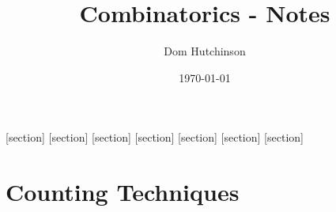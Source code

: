 \documentclass[11pt,a4paper]{article}
\begin{document}
\pagestyle{fancy}
\setlength\parindent{0pt}
\allowdisplaybreaks

\renewcommand{\headrulewidth}{0pt}

\title{Combinatorics - Notes}
\author{Dom Hutchinson}
\date{\today}
\maketitle

\fancyhead[R]{\today}

[section]
[section]
[section]
[section]
[section]
[section]
[section]

\newcommand{\dotprod}[0]{\boldsymbol{\cdot}}
\newcommand{\cosech}[0]{\mathrm{cosech}\ }
\newcommand{\cosec}[0]{\mathrm{cosec}\ }
\newcommand{\sech}[0]{\mathrm{sech}\ }
\newcommand{\blocks}[0]{\mathbb{B}}
\newcommand{\nats}[0]{\mathbb{N}}
\newcommand{\real}[0]{\mathbb{R}}
\newcommand{\integers}[0]{\mathbb{Z}}
\newcommand{\nb}[0]{\textit{N.B.} }

\newcommand{\definition}[1]{\stepcounter{definition} \textbf{Definition \arabic{section}.\arabic{definition}\ - }\textit{#1}\\}
\newcommand{\example}[1]{\stepcounter{example} \textbf{Example \arabic{section}.\arabic{example}\ - }\textit{#1}\\}
\newcommand{\notation}[1]{\stepcounter{notation} \textbf{Notation \arabic{section}.\arabic{notation}\ - }\textit{#1}\\}
\newcommand{\proof}[1]{\stepcounter{proof} \textbf{Proof \arabic{section}.\arabic{proof}\ - }\textit{#1}\\}
\newcommand{\proposition}[1]{\stepcounter{proposition} \textbf{Proposition \arabic{section}.\arabic{proposition}\ - }\textit{#1}\\}
\newcommand{\remark}[1]{\stepcounter{remark} \textbf{Remark \arabic{section}.\arabic{remark}\ - }\textit{#1}\\}
\newcommand{\theorem}[1]{\stepcounter{theorem} \textbf{Theorem \arabic{section}.\arabic{theorem}\ - }\textit{#1}\\}

\tableofcontents

\newpage

\section{Counting Techniques}
\end{document}
